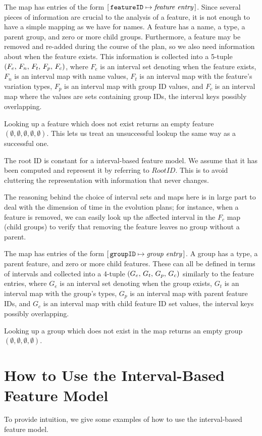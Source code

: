 The \features{} map has entries of the form $[ \,\texttt{featureID} \mapsto \textit{feature entry}\, ]$. Since several pieces of information are crucial to the analysis of a feature, it is not enough to have a simple mapping as we have for names.
A feature has a name, a type, a parent group, and zero or more child groups. Furthermore, a feature may be removed and re-added during the course of the plan, so we also need information about when the feature exists.
This information is collected into a 5-tuple $\left(F_e,\, F_n,\, F_t,\, F_p,\, F_c\right)$, where $F_e$ is an interval set denoting when the feature exists, $F_n$ is an interval map with name values, $F_t$ is an interval map with the feature's variation types, $F_p$ is an interval map with group ID values, and $F_c$ is an interval map where the values are sets containing group IDs, the interval keys possibly overlapping.

Looking up a feature which does not exist returns an empty feature $(\emptyset \comma \emptyset \comma \emptyset \comma \emptyset \comma \emptyset)$. This lets us treat an unsuccessful lookup the same way as a successful one.

The root ID is constant for a interval-based feature model. We assume that it has been computed and represent it by referring to $RootID$. This is to avoid cluttering the representation with information that never changes.

The reasoning behind the choice of interval sets and maps here is in large part to deal with the dimension of time in the evolution plans; for instance, when a feature is removed, we can easily look up the affected interval in the $F_c$ map (child groups) to verify that removing the feature leaves no group without a parent.

The \groups{} map has entries of the form $[ \,\texttt{groupID} \mapsto \textit{group entry}\, ]$. A group has a type, a parent feature, and zero or more child features. These can all be defined in terms of intervals and collected into a 4-tuple $\left(G_e,\, G_t,\, G_p,\, G_c\right)$ similarly to the feature entries, where $G_e$ is an interval set denoting when the group exists, $G_t$ is an interval map with the group's types, $G_p$ is an interval map with parent feature IDs, and $G_c$ is an interval map with child feature ID set values, the interval keys possibly overlapping.

Looking up a group which does not exist in the map returns an empty group $(\emptyset \comma \emptyset \comma \emptyset \comma \emptyset)$. 

\section{How to Use the Interval-Based Feature Model}
\label{sec:how-to-use-the-interval-based-feature-model}
To provide intuition, we give some examples of how to use the interval-based feature model.

